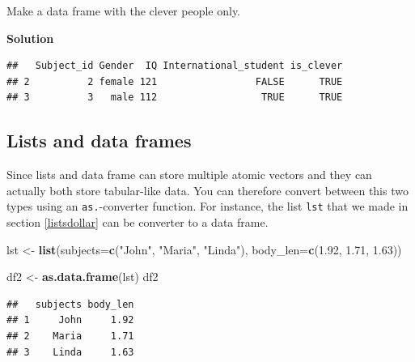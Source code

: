 \documentclass[
]{scrartcl}
\makeatletter
\newenvironment{Shaded}{\begin{snugshade}}{\end{snugshade}}
\newcommand{\CommentTok}[1]{\textcolor[rgb]{0.56,0.35,0.01}{\textit{#1}}}
\newcommand{\DataTypeTok}[1]{\textcolor[rgb]{0.13,0.29,0.53}{#1}}
\newcommand{\FloatTok}[1]{\textcolor[rgb]{0.00,0.00,0.81}{#1}}
\newcommand{\KeywordTok}[1]{\textcolor[rgb]{0.13,0.29,0.53}{\textbf{#1}}}
\newcommand{\NormalTok}[1]{#1}
\newcommand{\OperatorTok}[1]{\textcolor[rgb]{0.81,0.36,0.00}{\textbf{#1}}}
\newcommand{\StringTok}[1]{\textcolor[rgb]{0.31,0.60,0.02}{#1}}
\newenvironment{kframe}{%
\medskip{}
\setlength{\fboxsep}{.8em}
 \def\at@end@of@kframe{}%
 \ifinner\ifhmode%
  \def\at@end@of@kframe{\end{minipage}}%
  \begin{minipage}{\columnwidth}%
 \fi\fi%
 \def\FrameCommand##1{\hskip\@totalleftmargin \hskip-\fboxsep
 \colorbox{shadecolor}{##1}\hskip-\fboxsep
     \hskip-\linewidth \hskip-\@totalleftmargin \hskip\columnwidth}%
 \MakeFramed {\advance\hsize-\width
   \@totalleftmargin\z@ \linewidth\hsize
   \@setminipage}}%
 {\par\unskip\endMakeFramed%
 \at@end@of@kframe}
\newenvironment{rmdblock}[1]
  {
  \begin{itemize}
  \renewcommand{\labelitemi}{
    \raisebox{-.7\height}[0pt][0pt]{
      {\setkeys{Gin}{width=3em,keepaspectratio}\texttt{[image: images/\#1]}}
    }
  }
  \setlength{\fboxsep}{1em}
  \begin{kframe}
  \item
  }
  {
  \end{kframe}
  \end{itemize}
  }
\newenvironment{myexercise}
    {\begin{rmdblock}{exercise_green}}
    {\end{rmdblock}}
\newenvironment{webexsolution}[1]
    {\par\tiny\textbf{#1}}
    {\par}
\newcommand{\webexhide}[1]{\begin{webexsolution}{#1}}
\newcommand{\webexunhide}{\end{webexsolution}}
\makeatother
\begin{document}
\begin{myexercise}
Make a data frame with the clever people only.
\end{myexercise}
\webexhide{Solution}

\begin{Shaded}
\end{Shaded}

\begin{verbatim}
##   Subject_id Gender  IQ International_student is_clever
## 2          2 female 121                 FALSE      TRUE
## 3          3   male 112                  TRUE      TRUE
\end{verbatim}

\webexunhide

\hypertarget{lists-and-data-frames}{%
\subsection{Lists and data frames}\label{lists-and-data-frames}}

Since lists and data frame can store multiple atomic vectors and they can actually both store tabular-like data. You can therefore convert between this two types using an \texttt{as.}-converter function. For instance, the list \texttt{lst} that we made in section \ref{listsdollar} can be converter to a data frame.

\begin{Shaded}
\begin{Highlighting}[]
\NormalTok{lst \textless{}{-}}\StringTok{ }\KeywordTok{list}\NormalTok{(}\DataTypeTok{subjects=}\KeywordTok{c}\NormalTok{(}\StringTok{"John"}\NormalTok{, }\StringTok{"Maria"}\NormalTok{, }\StringTok{"Linda"}\NormalTok{),}
            \DataTypeTok{body\_len=}\KeywordTok{c}\NormalTok{(}\FloatTok{1.92}\NormalTok{, }\FloatTok{1.71}\NormalTok{, }\FloatTok{1.63}\NormalTok{))}

\NormalTok{df2 \textless{}{-}}\StringTok{ }\KeywordTok{as.data.frame}\NormalTok{(lst)}
\NormalTok{df2}
\end{Highlighting}
\end{Shaded}

\begin{verbatim}
##   subjects body_len
## 1     John     1.92
## 2    Maria     1.71
## 3    Linda     1.63
\end{verbatim}
\end{document}
